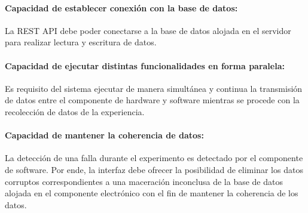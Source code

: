             \paragraph{Capacidad de establecer conexión con la base de datos:} 
                \par La REST API debe poder conectarse a la base de datos alojada en el servidor para realizar lectura y escritura de datos.
        
            \paragraph{Capacidad de ejecutar distintas funcionalidades en forma paralela:}
                \par Es requisito del sistema ejecutar de manera simultánea y continua la transmisión de datos entre el componente de hardware y software mientras se procede con la recolección de datos de la experiencia.
        
            \paragraph{Capacidad de mantener la coherencia de datos:}
                \par La detección de una falla durante el experimento es detectado por el componente de software. Por ende, la interfaz debe ofrecer la posibilidad de eliminar los datos corruptos correspondientes a una maceración inconclusa de la base de datos alojada en el componente electrónico con el fin de mantener la coherencia de los datos.
                
        

